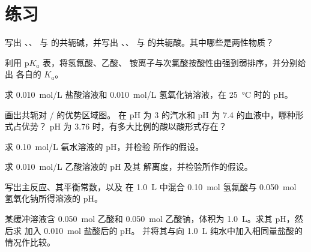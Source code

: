 \section{练习}

\begin{exercise}[$\star$]\label{exo:b1:predominant-reaction:1}
写出 、、 与
 的共轭碱，并写出 、、 与
 的共轭酸。其中哪些是两性物质？
\end{exercise}

\begin{exercise}[$\star$]\label{exo:b1:predominant-reaction:2}
利用 $\mathrm{p}K_a$ 表，将氢氟酸、乙酸、
铵离子与次氯酸按酸性由强到弱排序，并分别给出
各自的 $K_a$。
\end{exercise}

\begin{exercise}[$\star$]\label{exo:b1:predominant-reaction:3}
求 \qty{0.010}{mol/L} 盐酸溶液和
\qty{0.010}{mol/L} 氢氧化钠溶液，在
\qty{25}{\celsius} 时的 pH。
\end{exercise}

\begin{exercise}[$\star$]\label{exo:b1:predominant-reaction:4}
画出共轭对 / 的优势区域图。
在 pH 为 3 的汽水和 pH 为 7.4 的血液中，哪种形式占优势？
pH 为 3.76 时，有多大比例的酸以酸形式存在？
\end{exercise}

\begin{exercise}[$\star\star$]\label{exo:b1:predominant-reaction:5}
求 \qty{0.10}{mol/L} 氨水溶液的 pH，并检验
所作的假设。
\end{exercise}

\begin{exercise}[$\star\star$]\label{exo:b1:predominant-reaction:6}
求 \qty{0.010}{mol/L} 乙酸溶液的 pH 及其
解离度，并检验所作的假设。
\end{exercise}

\begin{exercise}[$\star\star$]\label{exo:b1:predominant-reaction:7}
写出主反应、其平衡常数，以及
在 \qty{1.0}{L} 中混合 \qty{0.10}{mol} 氢氟酸与
\qty{0.050}{mol} 氢氧化钠所得溶液的 pH。
\end{exercise}

\begin{exercise}[$\star\star$]\label{exo:b1:predominant-reaction:8}
某缓冲溶液含 \qty{0.050}{mol} 乙酸和 \qty{0.050}{mol}
乙酸钠，体积为 \qty{1.0}{L}。求其 pH，然后求
加入 \qty{0.010}{mol} 盐酸后的 pH。
并将其与向 \qty{1.0}{L} 纯水中加入相同量盐酸的情况作比较。
\end{exercise}

